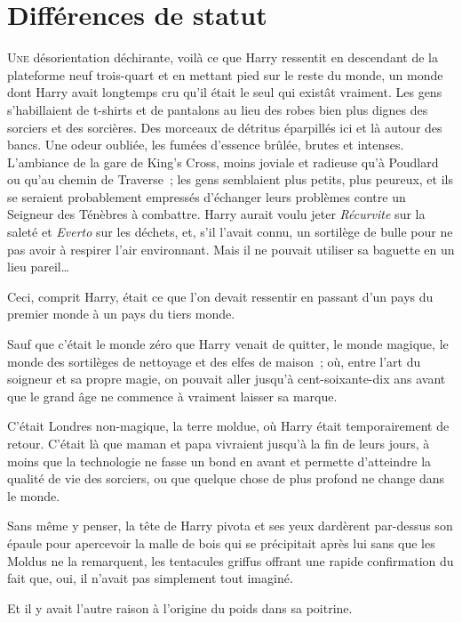 \chapter{Différences de statut}

\lettrine{U}{ne} désorientation déchirante, voilà ce que Harry ressentit en descendant de la plateforme neuf trois-quart et en mettant pied sur le reste du monde, un monde dont Harry avait longtemps cru qu'il était le seul qui existât vraiment.
Les gens s'habillaient de t-shirts et de pantalons au lieu des robes bien plus dignes des sorciers et des sorcières.
Des morceaux de détritus éparpillés ici et là autour des bancs.
Une odeur oubliée, les fumées d'essence brûlée, brutes et intenses.
L'ambiance de la gare de King's Cross, moins joviale et radieuse qu'à Poudlard ou qu'au chemin de Traverse~; les gens semblaient plus petits, plus peureux, et ils se seraient probablement empressés d'échanger leurs problèmes contre un Seigneur des Ténèbres à combattre.
Harry aurait voulu jeter \emph{Récurvite} sur la saleté et \emph{Everto} sur les déchets, et, s'il l'avait connu, un sortilège de bulle pour ne pas avoir à respirer l'air environnant.
Mais il ne pouvait utiliser sa baguette en un lieu pareil…

Ceci, comprit Harry, était ce que l'on devait ressentir en passant d'un pays du premier monde à un pays du tiers monde.

Sauf que c'était le monde zéro que Harry venait de quitter, le monde magique, le monde des sortilèges de nettoyage et des elfes de maison~; où, entre l'art du soigneur et sa propre magie, on pouvait aller jusqu'à cent-soixante-dix ans avant que le grand âge ne commence à vraiment laisser sa marque.

C'était Londres non-magique, la terre moldue, où Harry était temporairement de retour.
C'était là que maman et papa vivraient jusqu'à la fin de leurs jours, à moins que la technologie ne fasse un bond en avant et permette d'atteindre la qualité de vie des sorciers, ou que quelque chose de plus profond ne change dans le monde.

Sans même y penser, la tête de Harry pivota et ses yeux dardèrent par-dessus son épaule pour apercevoir la malle de bois qui se précipitait après lui sans que les Moldus ne la remarquent, les tentacules griffus offrant une rapide confirmation du fait que, oui, il n'avait pas simplement tout imaginé.

Et il y avait l'autre raison à l'origine du poids dans sa poitrine.

